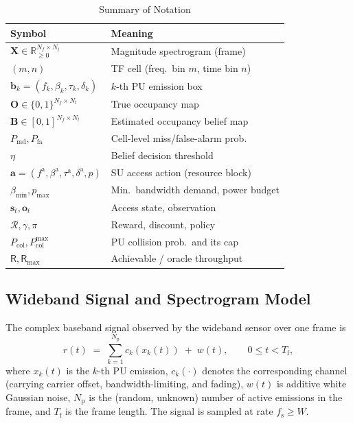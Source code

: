 \documentclass[journal]{IEEEtran}
\newcommand{\R}{\mathbb{R}}
\newcommand{\rx}{r}                       %
\newcommand{\sutx}{x}                      %
\newcommand{\noise}{w}                     %
\newcommand{\Npu}{N_{\mathrm{p}}}          %
\newcommand{\fs}{f_{\mathrm{s}}}           %
\newcommand{\Wband}{W}                     %
\newcommand{\spec}{\bm{X}}                 %
\newcommand{\Nf}{N_f}                      %
\newcommand{\Nt}{N_t}                      %
\newcommand{\cell}{(m,n)}                  %
\newcommand{\boxk}{\bm{b}}                 %
\newcommand{\bfc}{f}                       %
\newcommand{\bBW}{\beta}                   %
\newcommand{\bts}{\tau}                    %
\newcommand{\bdur}{\delta}                 %
\newcommand{\belmap}{\bm{B}}               %
\newcommand{\occmap}{\bm{O}}               %
\newcommand{\Pmd}{P_{\mathrm{md}}}         %
\newcommand{\Pfa}{P_{\mathrm{fa}}}         %
\newcommand{\thr}{\eta}                    %
\newcommand{\act}{\bm{a}}                  %
\newcommand{\afc}{f^{\mathrm{a}}}          %
\newcommand{\aBW}{\beta^{\mathrm{a}}}      %
\newcommand{\ats}{\tau^{\mathrm{a}}}       %
\newcommand{\adur}{\delta^{\mathrm{a}}}    %
\newcommand{\pwr}{p}                       %
\newcommand{\pmax}{p_{\max}}               %
\newcommand{\dmin}{\beta_{\min}}           %
\newcommand{\state}{\bm{s}}                %
\newcommand{\obs}{\bm{o}}                  %
\newcommand{\rew}{r}                       %
\renewcommand{\rew}{\mathcal{R}}           %
\newcommand{\pol}{\pi}                     %
\newcommand{\disc}{\gamma}                 %
\newcommand{\bigT}{T}                      %
\newcommand{\Pcol}{P_{\mathrm{col}}}       %
\newcommand{\Pcolmax}{P_{\mathrm{col}}^{\max}} %
\newcommand{\thru}{\mathsf{R}}             %
\newcommand{\thrumax}{\mathsf{R}_{\max}}   %
\begin{document}
\begin{table}[t]
\centering
\caption{Summary of Notation}
\label{tab:notation}
\begin{tabular}{ll}
\toprule
Symbol & Meaning \\
\midrule
$\spec\in\R_{\ge0}^{\Nf\times\Nt}$ & Magnitude spectrogram (frame) \\
$\cell$ & TF cell (freq.\ bin $m$, time bin $n$) \\
$\boxk_k=(\bfc_k,\bBW_k,\bts_k,\bdur_k)$ & $k$-th PU emission box \\
$\occmap\in\{0,1\}^{\Nf\times\Nt}$ & True occupancy map \\
$\belmap\in[0,1]^{\Nf\times\Nt}$ & Estimated occupancy belief map \\
$\Pmd,\Pfa$ & Cell-level miss/false-alarm prob.\ \\
$\thr$ & Belief decision threshold \\
$\act=(\afc,\aBW,\ats,\adur,\pwr)$ & SU access action (resource block) \\
$\dmin,\pmax$ & Min.\ bandwidth demand, power budget \\
$\state_t,\obs_t$ & Access state, observation \\
$\rew,\disc,\pol$ & Reward, discount, policy \\
$\Pcol,\Pcolmax$ & PU collision prob.\ and its cap \\
$\thru,\thrumax$ & Achievable / oracle throughput \\
\bottomrule
\end{tabular}
\end{table}

\subsection{Wideband Signal and Spectrogram Model}
\label{subsec:signal}
The complex baseband signal observed by the wideband sensor over one frame
is
\begin{equation}
\rx(t) \;=\; \sum_{k=1}^{\Npu} c_k\!\left(\sutx_k(t)\right) \;+\; \noise(t),
\qquad 0 \le t < \bigT_{\mathrm{f}},
\label{eq:rx}
\end{equation}
where $\sutx_k(t)$ is the $k$-th PU emission, $c_k(\cdot)$ denotes the
corresponding channel (carrying carrier offset, bandwidth-limiting, and
fading), $\noise(t)$ is additive white Gaussian noise, $\Npu$ is the
(random, unknown) number of active emissions in the frame, and
$\bigT_{\mathrm{f}}$ is the frame length. The signal is sampled at rate
$\fs \ge \Wband$.
\end{document}
